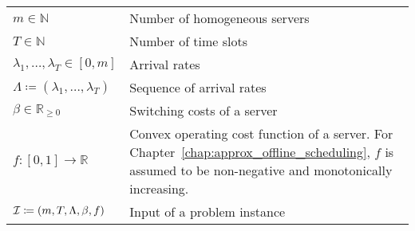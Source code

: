 
\begin{table}[H]
\begin{tabularx}{\textwidth}{ | >{\centering\arraybackslash}X | >{\arraybackslash}m{} | }
  \hline \multicolumn{2}{|c|}{\textbf{\large Input}} \\  
  \hline $m\in\mathbb{N}$ & Number of homogeneous servers \\
  \hline $T\in\mathbb{N}$& Number of time slots\\
  \hline $\lambda_1,\dotsc,\lambda_{T}\in[0,m]$& Arrival rates\\
  \hline $\Lambda\coloneqq(\lambda_1,\dotsc,\lambda_T)$& Sequence of arrival rates\\
  \hline $\beta\in\mathbb{R}_{\ge 0}$& Switching costs of a server\\
  \hline $f:[0,1]\rightarrow\mathbb{R}$& Convex operating cost function of a server. For Chapter~\ref{chap:approx_offline_scheduling}, $f$ is assumed to be non-negative and monotonically increasing.\\
  \hline $\mathcal{I}\coloneqq(m,T,\Lambda,\beta,f)$& Input of a problem instance\\
  \hline
\end{tabularx}
\end{table}

